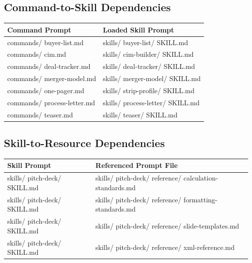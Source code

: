 \documentclass[11pt]{article}
\begin{document}
\subsection{Command-to-Skill Dependencies}

\begingroup
\small
\setlength{\tabcolsep}{2pt}
\begin{longtable}{>{\RaggedRight\arraybackslash\hspace{0pt}}p{}>{\RaggedRight\arraybackslash\hspace{0pt}}p{}}
\toprule
{} \textbf{Command Prompt} & \textbf{Loaded Skill Prompt} \\
\midrule
{} commands/ buyer-list.md & skills/ buyer-list/ SKILL.md \\
{} commands/ cim.md & skills/ cim-builder/ SKILL.md \\
{} commands/ deal-tracker.md & skills/ deal-tracker/ SKILL.md \\
{} commands/ merger-model.md & skills/ merger-model/ SKILL.md \\
{} commands/ one-pager.md & skills/ strip-profile/ SKILL.md \\
{} commands/ process-letter.md & skills/ process-letter/ SKILL.md \\
{} commands/ teaser.md & skills/ teaser/ SKILL.md \\
\bottomrule
\end{longtable}
\endgroup

\subsection{Skill-to-Resource Dependencies}

\begingroup
\small
\setlength{\tabcolsep}{2pt}
\begin{longtable}{>{\RaggedRight\arraybackslash\hspace{0pt}}p{}>{\RaggedRight\arraybackslash\hspace{0pt}}p{}}
\toprule
{} \textbf{Skill Prompt} & \textbf{Referenced Prompt File} \\
\midrule
{} skills/ pitch-deck/ SKILL.md & skills/ pitch-deck/ reference/ calculation-standards.md \\
{} skills/ pitch-deck/ SKILL.md & skills/ pitch-deck/ reference/ formatting-standards.md \\
{} skills/ pitch-deck/ SKILL.md & skills/ pitch-deck/ reference/ slide-templates.md \\
{} skills/ pitch-deck/ SKILL.md & skills/ pitch-deck/ reference/ xml-reference.md \\
\bottomrule
\end{longtable}
\endgroup
\end{document}
